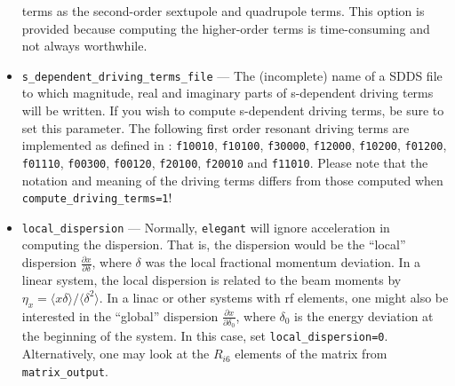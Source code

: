 \documentclass[11pt]{article}
\begin{document}
\begin{itemize}
  terms as the second-order sextupole and quadrupole terms. This option is provided because computing the higher-order terms is time-consuming and
  not always worthwhile.
\item \verb|s_dependent_driving_terms_file| --- The (incomplete) name of a SDDS file to which magnitude, real and imaginary parts of s-dependent driving terms will be written.
If you wish to compute s-dependent driving terms, be sure to set this parameter.
The following first order resonant driving terms are implemented as defined in \cite{sRDT}: {\tt f10010}, {\tt f10100}, 
{\tt f30000}, {\tt f12000}, {\tt f10200}, {\tt f01200}, {\tt f01110}, 
{\tt f00300}, {\tt f00120}, {\tt f20100}, {\tt f20010} and {\tt f11010}.
Please note that the notation and meaning of the driving terms differs from those computed when \verb|compute_driving_terms=1|!
\item \verb|local_dispersion| ---  Normally, {\tt elegant} will ignore acceleration in computing the
  dispersion.  That is, the dispersion would be the ``local'' dispersion $\frac{\partial x}{\partial \delta}$, where $\delta$
  was the local fractional momentum deviation.  In a linear system, the local dispersion is related to the
  beam moments by $\eta_x = \langle x \delta \rangle/\langle \delta^2 \rangle$.
  In a linac or other systems with rf elements, one might also be interested 
  in the ``global'' dispersion
  $\frac{\partial x}{\partial \delta_0}$, where $\delta_0$ is the energy deviation at the beginning of the system.
  In this case, set \verb|local_dispersion=0|.  Alternatively, one may look at the $R_{i6}$ elements of the matrix from 
  \verb|matrix_output|.
\end{itemize}
\end{document}
